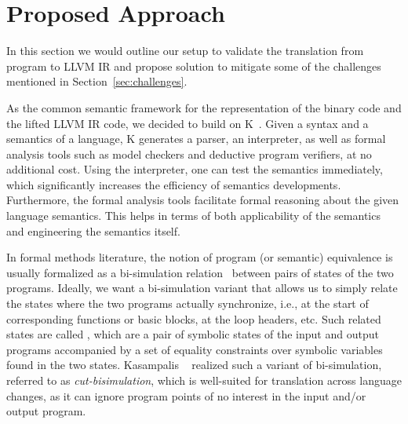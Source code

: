 \section{Proposed Approach}\label{sec:approach} In this section we would
outline our setup to validate the translation from \ISA program to LLVM IR and
propose solution to mitigate some of the challenges mentioned in
Section~\ref{sec:challenges}.


As the common semantic framework for the representation of the binary code and
the lifted LLVM IR code, we decided to build on K~\cite{k-primer-2013-v32}.
        Given a syntax and a semantics of a language, K generates a parser, an
        interpreter, as well as formal analysis tools such as model checkers
        and deductive program verifiers, at no additional cost.  Using the
        interpreter, one can test the semantics immediately, which
        significantly increases the efficiency of semantics developments.
        Furthermore, the formal analysis tools facilitate formal reasoning
        about the given language semantics. This helps in terms of both
        applicability of the semantics and engineering the semantics itself.
    

In formal methods literature, the notion of program (or semantic) equivalence
is usually formalized as a bi-simulation relation~\cite{Sangiorgi:2011} between
pairs of states of the two programs.
Ideally, we want a bi-simulation variant that allows us to simply relate the
states where the two programs actually synchronize, i.e., at the start of
corresponding functions or basic blocks, at the loop headers, etc. Such related states are called \syncps, which are a pair of symbolic states of the input and output programs accompanied by a set of equality constraints over symbolic variables found in the two states. Kasampalis \etal~\cite{TheoSAS19} realized such a variant of bi-simulation, referred to as  \emph{cut-bisimulation}, which is  well-suited for translation  across
language changes, as it can ignore program points of no interest in the input
and/or output program.
%

